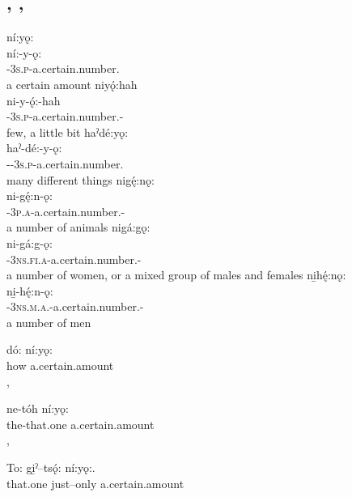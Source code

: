 \subsection{ , , } \label{[-ǫ:] be a certain amount, three or more, a few}
\ea\label{ex:countingdict1} 
\ea ní:yǫ: \\
\gll ní:-y-ǫ:\\
\textsc{{\partitive}-3s.p}-a.certain.number.{\stative}\\
\glt a certain amount
\newpage
\ex niyǫ́:hah \\
\gll ni-y-ǫ́:-hah\\
\textsc{{\partitive}-3s.p}-a.certain.number.{\stative}-{\diminutive}\\
\glt few, a little bit
\ex haˀdé:yǫ:\\
\gll haˀ-dé:-y-ǫ:\\
\textsc{{\translocative}-{\dualic}-3s.p}-a.certain.number.{\stative}\\
\glt many different things
\ex nigę́:nǫ: \\
\gll ni-gę́:n-ǫ: \\
\textsc{{\partitive}-3p.a}-a.certain.number.{\stative}-{\diminutive}\\
\glt a number of animals
\ex nigá:gǫ: \\
\gll ni-gá:g-ǫ: \\
\textsc{{\partitive}-3ns.fi.a}-a.certain.number.{\stative}-{\diminutive}\\
\glt a number of women, or a mixed group of males and females
\ex ni̱hę́:nǫ:\\
\gll ni̱-hę́:n-ǫ:\\
\textsc{{\partitive}-3ns.m.a.}-a.certain.number.{\stative}-{\diminutive}\\
\glt a number of men
\z
\z


\ea\label{ex:countingdict2} 
\gll dó: ní:yǫ: \\
how a.certain.amount\\
\cayuga{\glt} , 
\z

\ea\label{ex:countingdict3} 
\gll ne-tóh ní:yǫ: \\
the-that.one a.certain.amount\\
\cayuga{\glt} , 
\z

\ea\label{ex:countingdict4} 
\gll To: gi̱ˀ–tsǫ́: ní:yǫ:.\\
that.one just–only a.certain.amount\\
\cayuga{\glt} 
\z

